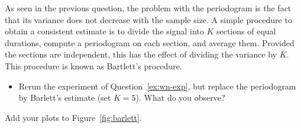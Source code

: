 \documentclass[11pt]{article}
\begin{document}
\begin{exercise}\label{q:barlett}
    As seen in the previous question, the problem with the periodogram is the fact that its variance does not decrease with the sample size.
    A simple procedure to obtain a consistent estimate is to divide the signal into $K$ sections of equal durations, compute a periodogram on each section, and average them.
    Provided the sections are independent, this has the effect of dividing the variance by $K$. 
    This procedure is known as Bartlett's procedure.
    \begin{itemize}
        \item Rerun the experiment of Question~\ref{ex:wn-exp}, but replace the periodogram by Barlett's estimate (set $K=5$). What do you observe?
    \end{itemize}
    Add your plots to Figure~\ref{fig:barlett}.
\end{exercise}
\end{document}
